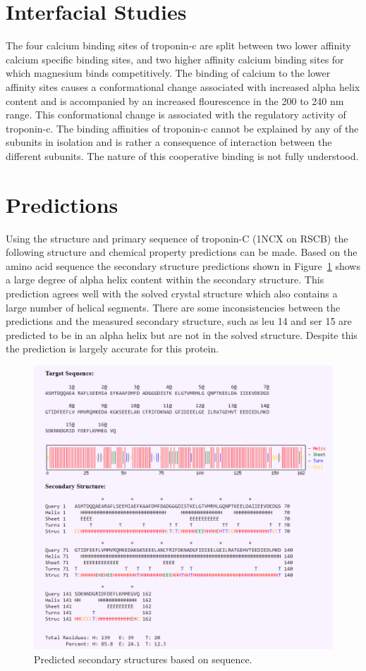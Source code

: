\documentclass[12pt]{article}
\begin{document}
	\section{Interfacial Studies}
	The four calcium binding sites of troponin-c are split between two lower affinity calcium specific binding sites, and two higher affinity calcium binding sites for which magnesium binds competitively. The binding of calcium to the lower affinity sites causes a conformational change associated with increased alpha helix content and is accompanied by an increased flourescence in the 200 to 240 nm range.\cite{Leavis1978} This conformational change is associated with the regulatory activity of troponin-c. The binding affinities of troponin-c cannot be explained by any of the subunits in isolation and is rather a consequence of interaction between the different subunits. The nature of this cooperative binding is not fully understood.\cite{Leavis1978}
	
	\section{Predictions}
	Using the structure and primary sequence of troponin-C (1NCX on RSCB) the following structure and chemical property predictions can be made. Based on the amino acid sequence the secondary structure predictions shown in Figure~\ref{secondStruct} shows a large degree of alpha helix content within the secondary structure. This prediction agrees well with the solved crystal structure which also contains a large number of helical segments. There are some inconsistencies between the predictions and the measured secondary structure, such as leu 14 and ser 15 are predicted to be in an alpha helix but are not in the solved structure. Despite this the prediction is largely accurate for this protein.
	
	\begin{figure}[H]
		\centering
		\includegraphics[width=.95\linewidth]{SecondaryStructureAnalysisPlot.png}
		
		\caption{Predicted secondary structures based on sequence.}
		\label{secondStruct}
	\end{figure}
	
\end{document}

